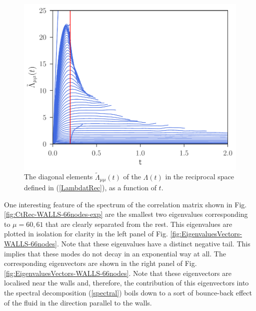 \documentclass[b5paper,openright,10pt]{book}
\begin{document}
\begin{figure}[h!]
  \centering
\includegraphics[scale=0.41]{LambdatRec-WALLS-66nodes}
\caption[Diagonal elements  $\tilde{\Lambda}_{\mu\mu}(t)$ of $\Lambda(t)$ in the reciprocal space for a confined fluid - Thin bins]{The  diagonal elements  $\tilde{\Lambda}_{\mu\mu}(t)$ of  the
  $\Lambda(t)$ in the reciprocal space defined in (\ref{LambdatRec}), as a
  function of $t$.}
\label{fig:LambdatRec-WALLS-66nodes}
\end{figure}

One  interesting feature  of the  spectrum of  the correlation  matrix
shown  in  Fig.  \ref{fig:CtRec-WALLS-66nodes-exp}  are  the  smallest two  eigenvalues
corresponding to $\mu=60,61$  that are clearly separated from the rest.
This eigenvalues are plotted in isolation for clarity in the left panel
of  Fig.  \ref{fig:EigenvaluesVectors-WALLS-66nodes}.   Note that  these eigenvalues  have a
distinct negative tail. This implies that  these modes do not decay in
an exponential way at all. The corresponding eigenvectors are shown in
the  right  panel of  Fig.   \ref{fig:EigenvaluesVectors-WALLS-66nodes}.   Note that  these
eigenvectors  are  localised  near   the  walls  and,  therefore,  the
contribution  of this  eigenvectors  into  the spectral  decomposition
(\ref{spectral}) boils  down to  a sort of  bounce-back effect  of the
fluid in the direction parallel to the walls.
\end{document}
